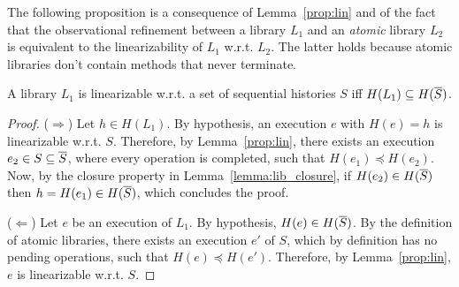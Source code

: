 

The following proposition is a consequence of Lemma~\ref{prop:lin} and of the fact that the observational refinement between
a library $L_1$ and an \emph{atomic} library $L_2$ is equivalent to the linearizability of $L_1$ w.r.t. $L_2$. The latter holds
because atomic libraries don't contain methods that never terminate.

\begin{proposition}

A library $L_1$ is linearizable w.r.t. a set of sequential histories $S$ iff $H(L_1)\subseteq H(\overline{{S}})$.

\end{proposition}

\begin{proof}

($\Rightarrow$) Let $h\in H(L_1)$. By hypothesis, an execution $e$ with $H(e)=h$ is linearizable w.r.t. $S$.
Therefore, by Lemma~\ref{prop:lin}, there exists an execution $e_2\in S\subseteq  \overline{{S}}$, where every operation is completed, 
such that $H(e_1)\preceq H(e_2)$. Now, by the closure property in Lemma~\ref{lemma:lib_closure}, if $H(e_2)\in H(\overline{{S}})$
then $h=H(e_1)\in H(\overline{{S}})$, which concludes the proof.

($\Leftarrow$) Let $e$ be an execution of $L_1$. By hypothesis, $H(e)\in H(\overline{{S}})$. 
By the definition of atomic libraries, %
there exists an execution $e'$ of $S$, which by definition has no pending operations, such that $H(e)\preceq H(e')$.
%
Therefore, by Lemma~\ref{prop:lin}, $e$ is linearizable w.r.t. $S$.

\end{proof}


